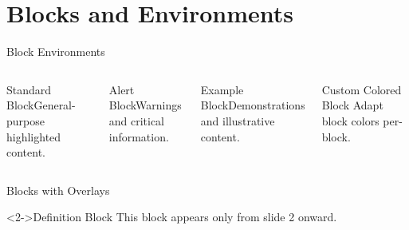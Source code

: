 \documentclass[doctype=beamer, beameraspectratio=169, beamertheme=Madrid, institution=generic]{omnilatex}
\begin{document}
\section{Blocks and Environments}
\begin{frame}{Block Environments}
  \begin{columns}[T]
    \begin{block}{Standard Block}General-purpose highlighted content.\end{block}
    \begin{alertblock}{Alert Block}Warnings and critical information.\end{alertblock}
    \begin{exampleblock}{Example Block}Demonstrations and illustrative content.\end{exampleblock}
    \begin{block}{Custom Colored Block}
      Adapt block colors per-block.
    \end{block}
  \end{columns}
\end{frame}

\begin{frame}{Blocks with Overlays}
  \begin{block}<2->{Definition Block}
    This block appears only from slide 2 onward.
  \end{block}
\end{frame}
\end{document}
